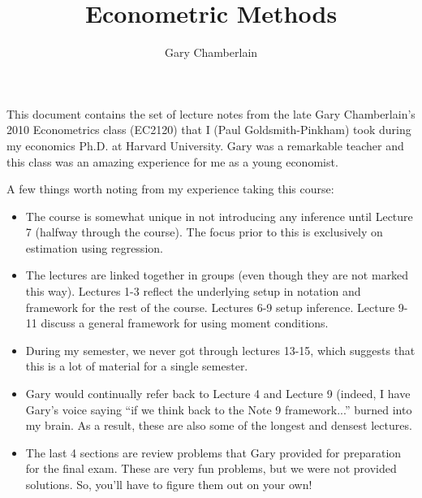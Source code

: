 


\newcommand{\fakesection}[1]{%
  \par\refstepcounter{section}%
  \sectionmark{#1}%
  \addcontentsline{toc}{section}{Lecture \thesection: #1}%
}
\newcommand{\fakesectionb}[1]{%
  \par\refstepcounter{section}%
  \sectionmark{#1}%
  \addcontentsline{toc}{section}{\protect#1}%
}
\usepackage{pdfpages}
\usepackage{hyperref}

\title{Econometric Methods}
\author{Gary Chamberlain}
\date{}  

\maketitle

This document contains the set of lecture notes from the late Gary
Chamberlain's 2010 Econometrics class (EC2120) that I (Paul
Goldsmith-Pinkham) took during my economics Ph.D. at Harvard
University. Gary was a remarkable teacher and this class was an
amazing experience for me as a young economist.

A few things worth noting from my experience taking this course: 
\begin{itemize}
\item The course is somewhat unique in not introducing any inference
  until Lecture 7 (halfway through the course). The focus prior to
  this is exclusively on estimation using regression.
\item The lectures are linked together in groups (even though they are
  not marked this way). Lectures 1-3 reflect the underlying setup in
  notation and framework for the rest of the course. Lectures 6-9
  setup inference. Lecture 9-11 discuss a general framework for using
  moment conditions.
\item During my semester, we never got through lectures 13-15, which
  suggests that this is a lot of material for a single semester.
\item Gary would continually refer back to Lecture 4 and Lecture 9
  (indeed, I have Gary's voice saying ``if we think back to the Note 9
  framework...'' burned into my brain. As a result, these are also
  some of the longest and densest lectures.
\item The last 4 sections are review problems that Gary provided for
  preparation for the final exam. These are very fun problems, but we
  were not provided solutions. So, you'll have to figure them out on
  your own!
\end{itemize}

